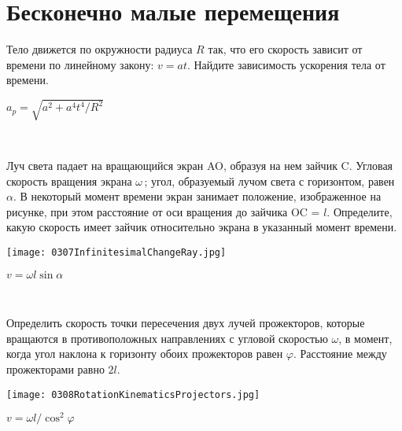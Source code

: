 \section{Бесконечно малые перемещения}

\begin{ex}
Тело движется по окружности радиуса $R$ так, что его скорость зависит от времени по линейному закону: $v = at$. Найдите зависимость ускорения тела от времени.
\begin{ans}
$a_p = \sqrt{a^2 + a^4t^4/R^2}$
\end{ans}
\end{ex}

\begin{ex}
\hspace{0pt} \\
\begin{minipage}{.65\textwidth}
Луч света падает на вращающийся экран AO, образуя на нем зайчик C. Угловая скорость вращения экрана $\omega$\,; угол, образуемый лучом света с горизонтом, равен $\alpha$. В некоторый момент времени экран занимает положение, изображенное на рисунке, при этом расстояние от оси вращения до зайчика OC = $l$. Определите, какую скорость имеет зайчик относительно экрана в указанный момент времени.
\end{minipage}
\begin{minipage}{.35\textwidth}
\centering
\texttt{[image: 0307InfinitesimalChangeRay.jpg]}
\end{minipage}
\begin{ans}
$v = \omega l \sin \alpha$
\end{ans}
\end{ex}

\begin{ex}
\hspace{0pt} \\
\begin{minipage}{.65\textwidth}
Определить скорость точки пересечения двух лучей прожекторов, которые вращаются в противоположных направлениях с угловой скоростью $\omega$, в момент, когда угол наклона к горизонту обоих прожекторов равен $\varphi$. Расстояние между прожекторами равно $2l$.
\end{minipage}
\begin{minipage}{.35\textwidth}
\centering
\texttt{[image: 0308RotationKinematicsProjectors.jpg]}
\end{minipage}
\begin{ans}
$v = \omega l/ \cos^2 \varphi$
\end{ans}
\end{ex}

